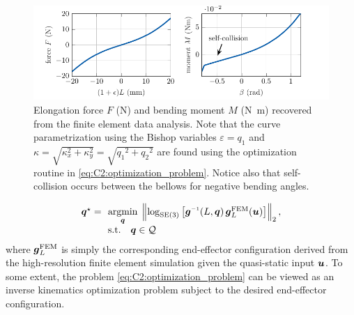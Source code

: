 \begin{figure}[!t]
 \vspace{-1mm}
  \hspace{-2mm}
  \includegraphics*{./pdf/thesis-figure-4-7.pdf}
  \caption{Elongation force $F$ (\si{\newton}) and bending moment $M$ (\si{\newton \meter}) recovered from the finite element data analysis. Note that the curve parametrization using the Bishop variables $ \varepsilon = q_1$ and $\kappa = \sqrt{ \kappa_x^2 +  \kappa_y^2} = \sqrt{ {q_1}^2 +  {q_2}^2}$ are found using the optimization routine in \eqref{eq:C2:optimization_problem}. Notice also that self-collision occurs between the bellows for negative bending angles.}
  \vspace{-0.4cm}
  \label{fig:C2:fem_stress}
\end{figure}

%
\begin{align}
\begin{array}{ll}
\q^\star = & \!\!\underset{\q}{\textrm{argmin}}\; \left \lVert \log_{\SE{3}}\left[ \gB\inv(L,\q)\,\gB_L^{\textrm{FEM}}(\vec{u}) \right] \right \rVert_2,\\
& \!\!\textrm{s.t.} \quad \q \in \mathcal{Q} 
\end{array}
\label{eq:C2:optimization_problem}
\end{align}
%
where ${\boldsymbol{g}}_L^{\textrm{FEM}}$ is simply the corresponding end-effector configuration derived from the high-resolution finite element simulation given the quasi-static input ${\boldsymbol{u}}$. To some extent, the problem \eqref{eq:C2:optimization_problem} can be viewed as an inverse kinematics optimization problem subject to the desired end-effector configuration.


